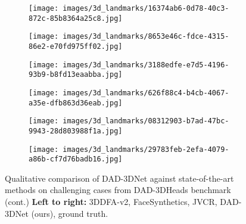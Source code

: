 \documentclass[10pt,twocolumn,letterpaper]{article}
\begin{document}
    \begin{figure*}[t]\ContinuedFloat
            \centering

        \begin{subfigure}[t]{0.85\textwidth}
        \texttt{[image: images/3d\_landmarks/16374ab6-0d78-40c3-872c-85b8364a25c8.jpg]}
    \end{subfigure}
        \begin{subfigure}[t]{0.85\textwidth}
        \texttt{[image: images/3d\_landmarks/8653e46c-fdce-4315-86e2-e70fd975ff02.jpg]}
    \end{subfigure}
        \begin{subfigure}[t]{0.85\textwidth}
        \texttt{[image: images/3d\_landmarks/3188edfe-e7d5-4196-93b9-b8fd13eaabba.jpg]}
    \end{subfigure}
    \begin{subfigure}[t]{0.85\textwidth}
        \texttt{[image: images/3d\_landmarks/626f88c4-b4cb-4067-a35e-dfb863d36eab.jpg]}
    \end{subfigure}
        \begin{subfigure}[t]{0.85\textwidth}
        \texttt{[image: images/3d\_landmarks/08312903-b7ad-47bc-9943-28d803988f1a.jpg]}
    \end{subfigure}
            \begin{subfigure}[t]{0.85\textwidth}
        \texttt{[image: images/3d\_landmarks/29783feb-2efa-4079-a86b-cf7d76badb16.jpg]}
    \end{subfigure}
  \caption{Qualitative comparison of DAD-3DNet against state-of-the-art methods on challenging cases from DAD-3DHeads benchmark (cont.)  \textbf{Left to right:} 3DDFA-v2\cite{guo2020towards}, FaceSynthetics\cite{wood2021fake}, JVCR\cite{jvcr}, DAD-3DNet (ours), ground truth.}
  \vspace{-1em}
  \label{fig:3d_landmarks_dad_c}
\end{figure*}

\clearpage
\end{document}
